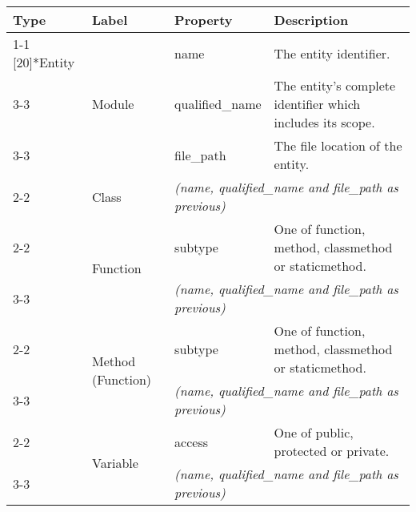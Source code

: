 \begin{tabularx}{\textwidth}{p{1.8cm}llX}
\toprule
\textbf{Type} & \textbf{Label} & \textbf{Property} & \textbf{Description} \\
\cmidrule{1-1}\cmidrule{2-2}\cmidrule{3-3}\cmidrule{4-4}
\multirow{10}[20]{*}{Entity} & \multirow{3}[6]{*}{\textsf{Module}} & \textsf{name} & The entity identifier. \\
\cmidrule{3-3}\cmidrule{4-4}
 &  & \textsf{qualified\_\textsf{name}} & The entity's complete identifier which includes its scope. \\
\cmidrule{3-3}\cmidrule{4-4}
 &  & \textsf{file\_path} & The file location of the entity. \\
\cmidrule{2-2}\cmidrule{3-3}\cmidrule{4-4}
 & \textsf{Class} & \multicolumn{2}{l}{\textit{(\textsf{name}, \textsf{qualified\_\textsf{name}} and \textsf{file\_path} as previous)}} \\
\cmidrule{2-2}\cmidrule{3-3}\cmidrule{4-4}
 & \multirow{2}[4]{*}{\textsf{Function}} & \textsf{subtype} & One of \textsf{function}, \textsf{method}, \textsf{class\textsf{method}} or \textsf{static\textsf{method}}. \\
\cmidrule{3-3}\cmidrule{4-4}
 &  & \multicolumn{2}{l}{\textit{(\textsf{name}, \textsf{qualified\_\textsf{name}} and \textsf{file\_path} as previous)}} \\
\cmidrule{2-2}\cmidrule{3-3}\cmidrule{4-4}
 & \multirow{2}[4]{*}{\textsf{Method} (\textsf{Function})} & \textsf{subtype} & One of \textsf{function}, \textsf{method}, \textsf{class\textsf{method}} or \textsf{static\textsf{method}}. \\
\cmidrule{3-3}\cmidrule{4-4}
 &  & \multicolumn{2}{l}{\textit{(\textsf{name}, \textsf{qualified\_\textsf{name}} and \textsf{file\_path} as previous)}} \\
\cmidrule{2-2}\cmidrule{3-3}\cmidrule{4-4}
 & \multirow{2}[4]{*}{\textsf{Variable}} & \textsf{access} & One of \textsf{public}, \textsf{protected} or \textsf{private}. \\
\cmidrule{3-3}\cmidrule{4-4}
 &  & \multicolumn{2}{l}{\textit{(\textsf{name}, \textsf{qualified\_\textsf{name}} and \textsf{file\_path} as previous)}} \\
\bottomrule
\end{tabularx}

